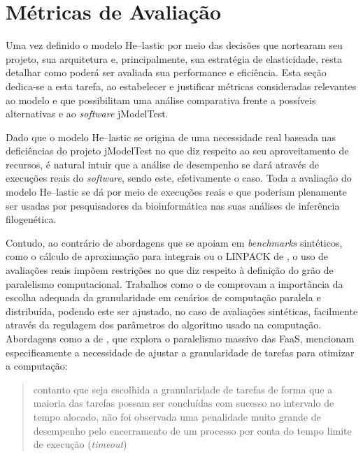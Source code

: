\documentclass[english,brazilian]{UNISINOSmonografia} %
\begin{document}
\section{Métricas de Avaliação}
\label{sec:modelo-metricas}



Uma vez definido o modelo \textsf{He}--lastic por meio das decisões que nortearam seu projeto, sua arquitetura e, principalmente, sua estratégia de elasticidade, resta detalhar como poderá ser avaliada sua performance e eficiência.
Esta seção dedica-se a esta tarefa, ao estabelecer e justificar métricas consideradas relevantes ao modelo e que possibilitam uma análise comparativa frente a possíveis alternativas e ao \textit{software} jModelTest.


Dado que o modelo \textsf{He}--lastic se origina de uma necessidade real baseada nas deficiências do projeto jModelTest no que diz respeito ao seu aproveitamento de recursos, é natural intuir que a análise de desempenho se dará através de execuções reais do \textit{software}, sendo este, efetivamente o caso.
Toda a avaliação do modelo \textsf{He}--lastic se dá por meio de execuções reais e que poderiam plenamente ser usadas por pesquisadores da bioinformática nas suas análises de inferência filogenética.


Contudo, ao contrário de abordagens que se apoiam em \textit{benchmarks} sintéticos, como o cálculo de aproximação para integrais ou o LINPACK de , o uso de avaliações reais impõem restrições no que diz respeito à definição do grão de paralelismo computacional.
Trabalhos como o de  comprovam a importância da escolha adequada da granularidade em cenários de computação paralela e distribuída, podendo este ser ajustado, no caso de avaliações sintéticas, facilmente através da regulagem dos parâmetros do algoritmo usado na computação.
Abordagens como a de , que explora o paralelismo massivo das FaaS, mencionam especificamente a necessidade de ajustar a granularidade de tarefas para otimizar a computação:
\begin{quote}
	contanto que seja escolhida a granularidade de tarefas de forma que a maioria das tarefas possam ser concluídas com sucesso no intervalo de tempo alocado, não foi observada uma penalidade muito grande de desempenho pelo encerramento de um processo por conta do tempo limite de execução (\textit{timeout})
\end{quote}
\end{document}
